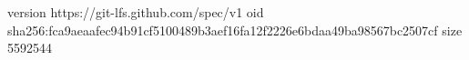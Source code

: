 version https://git-lfs.github.com/spec/v1
oid sha256:fca9aeaafec94b91cf5100489b3aef16fa12f2226e6bdaa49ba98567bc2507cf
size 5592544
